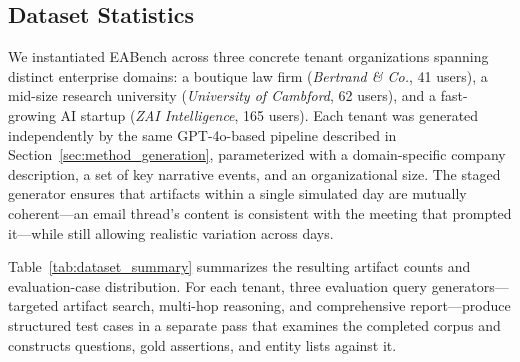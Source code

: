 
\subsection{Dataset Statistics}
\label{sec:dataset-stats}

We instantiated EABench across three concrete tenant organizations spanning distinct enterprise domains: a boutique law firm (\emph{Bertrand \& Co.}, 41 users), a mid-size research university (\emph{University of Cambford}, 62 users), and a fast-growing AI startup (\emph{ZAI Intelligence}, 165 users). Each tenant was generated independently by the same GPT-4o-based pipeline described in Section~\ref{sec:method_generation}, parameterized with a domain-specific company description, a set of key narrative events, and an organizational size. The staged generator ensures that artifacts within a single simulated day are mutually coherent---an email thread's content is consistent with the meeting that prompted it---while still allowing realistic variation across days.

Table~\ref{tab:dataset_summary} summarizes the resulting artifact counts and evaluation-case distribution. For each tenant, three evaluation query generators---targeted artifact search, multi-hop reasoning, and comprehensive report---produce structured test cases in a separate pass that examines the completed corpus and constructs questions, gold assertions, and entity lists against it.

